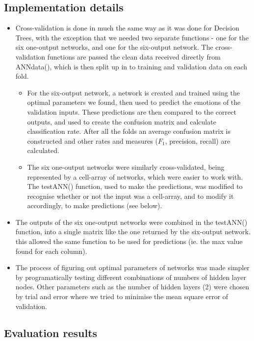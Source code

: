 \documentclass[12pt]{article}
\begin{document}
\subsection*{Implementation details}
\begin{itemize}
  \item Cross-validation is done in much the same way as it was done for Decision Trees, with the exception that we needed two separate functions - one for the six one-output networks, and one for the six-output network. The cross-validation functions are passed the clean data received directly from ANNdata(), which is then split up in to training and validation data on each fold.
  \begin{itemize}
    \item For the six-output network, a network is created and trained using the optimal parameters we found, then used to predict the emotions of the validation inputs. These predictions are then compared to the correct outputs, and used to create the confusion matrix and calculate classification rate. After all the folds an average confusion matrix is constructed and other rates and measures ($F_1$, precision, recall) are calculated.
    \item The six one-output networks were similarly cross-validated, being represented by a cell-array of networks, which were easier to work with. The testANN() function, used to make the predictions, was modified to recognise whether or not the input was a cell-array, and to modify it accordingly, to make predictions (see below).
  \end{itemize}
  \item The outputs of the six one-output networks were combined in the testANN() function, into a single matrix like the one returned by the six-output network. this allowed the same function to be used for predictions (ie. the max value found for each column).
  \item The process of figuring out optimal parameters of networks was made simpler by programatically testing different combinations of numbers of hidden layer nodes. Other parameters such as the number of hidden layers (2) were chosen by trial and error where we tried to minimise the mean square error of validation.
\end{itemize}


\subsection*{Evaluation results}
\end{document}
